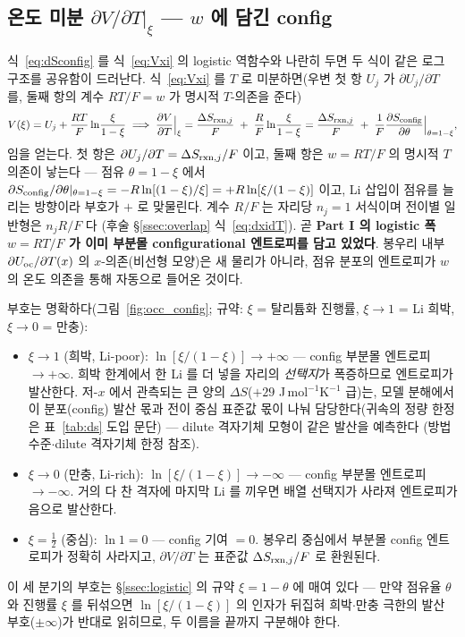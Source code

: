 \subsection{온도 미분 $\partial V/\partial T|_\xi$ --- $w$ 에 담긴 config}\label{ssec:dvdt}
식~\eqref{eq:dSconfig} 를 식~\eqref{eq:Vxi} 의 logistic 역함수와 나란히 두면 두 식이 같은 로그 구조를 공유함이
드러난다. 식~\eqref{eq:Vxi} 를 $T$ 로 미분하면(우변 첫 항 $U_j$ 가 $\partial U_j/\partial T$ 를, 둘째 항의
계수 $RT/F=w$ 가 명시적 $T$-의존을 준다)
\begin{equation}
V(\xi)=U_j+\frac{RT}{F}\ln\!\frac{\xi}{1-\xi}
\;\Longrightarrow\;
\frac{\partial V}{\partial T}\Big|_\xi
= \frac{\Delta S_{\mathrm{rxn},j}}{F}\;+\;\frac{R}{F}\ln\!\frac{\xi}{1-\xi}
= \frac{\Delta S_{\mathrm{rxn},j}}{F}\;+\;\frac{1}{F}\frac{\partial S_{\mathrm{config}}}{\partial\theta}\Big|_{\theta=1-\xi},
\label{eq:dVdT_config}
\end{equation}
임을 얻는다. 첫 항은 $\partial U_j/\partial T=\Delta S_{\mathrm{rxn},j}/F$ 이고, 둘째 항은 $w=RT/F$ 의 명시적 $T$
의존이 낳는다 --- 점유 $\theta=1-\xi$ 에서
$\partial S_{\mathrm{config}}/\partial\theta|_{\theta=1-\xi}=-R\ln[(1-\xi)/\xi]=+R\ln[\xi/(1-\xi)]$ 이고, Li 삽입이 점유를
늘리는 방향이라 부호가 $+$ 로 맞물린다. 계수 $R/F$ 는 자리당 $n_j{=}1$ 서식이며 전이별 일반형은 $n_jR/F$ 다
(후술 \S\ref{ssec:overlap} 식~\eqref{eq:dxidT}). 곧 \textbf{Part I 의 logistic 폭 $w=RT/F$ 가 이미 부분몰
configurational 엔트로피를 담고 있었다}. 봉우리 내부 $\partial U_{\mathrm{oc}}/\partial T(x)$ 의 $x$-의존(비선형 모양)은
새 물리가 아니라, 점유 분포의 엔트로피가 $w$ 의 온도 의존을 통해 자동으로 들어온 것이다.

부호는 명확하다(그림~\ref{fig:occ_config}; 규약: $\xi$ = 탈리튬화 진행률, $\xi\to1$ = Li 희박, $\xi\to0$ = 만충):
\begin{itemize}[leftmargin=1.4em,itemsep=1pt]
\item $\xi\to1$ (희박, Li-poor): $\ln[\xi/(1-\xi)]\to+\infty$ --- config 부분몰 엔트로피 $\to+\infty$. 희박
한계에서 한 Li 를 더 넣을 자리의 \emph{선택지}가 폭증하므로 엔트로피가 발산한다. 저-$x$ 에서 관측되는 큰 양의
$\Delta S$($+29$ J\,mol$^{-1}$K$^{-1}$ 급)는, 모델 분해에서 이 분포(config) 발산 몫과 전이 중심 표준값 몫이
나눠 담당한다(귀속의 정량 한정은 표~\ref{tab:ds} 도입 문단) --- dilute 격자기체 모형이 같은 발산을 예측한다
\cite{occupation2019}(방법 수준$\cdot$dilute 격자기체 한정 참조).
\item $\xi\to0$ (만충, Li-rich): $\ln[\xi/(1-\xi)]\to-\infty$ --- config 부분몰 엔트로피 $\to-\infty$. 거의 다 찬
격자에 마지막 Li 를 끼우면 배열 선택지가 사라져 엔트로피가 음으로 발산한다.
\item $\xi=\tfrac12$ (중심): $\ln 1=0$ --- config 기여 $=0$. 봉우리 중심에서 부분몰 config 엔트로피가 정확히
사라지고, $\partial V/\partial T$ 는 표준값 $\Delta S_{\mathrm{rxn},j}/F$ 로 환원된다.
\end{itemize}
이 세 분기의 부호는 \S\ref{ssec:logistic} 의 규약 $\xi=1-\theta$ 에 매여 있다 --- 만약 점유율 $\theta$ 와
진행률 $\xi$ 를 뒤섞으면 $\ln[\xi/(1-\xi)]$ 의 인자가 뒤집혀 희박$\cdot$만충 극한의 발산 부호($\pm\infty$)가
반대로 읽히므로, 두 이름을 끝까지 구분해야 한다.

